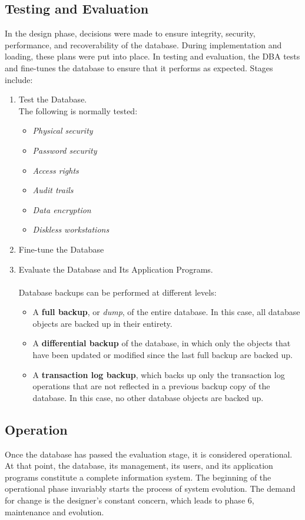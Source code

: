 \documentclass[a4paper, 12pt, titlepage]{report}
\begin{document}
\subsection{Testing and	Evaluation}
In the design phase, decisions were made to ensure integrity, security, performance, and recoverability of the database. During implementation and loading, these plans were put into place. In testing and evaluation, the DBA tests and fine-tunes the database to ensure that it performs as expected. Stages include:
\begin{enumerate}
\item Test the Database. \\ The following is normally tested:
\begin{itemize}
\item \emph{Physical security}
\item \emph{Password security }
\item \emph{Access rights}
\item \emph{Audit trails }
\item \emph{Data encryption}
\item \emph{Diskless workstations}
\end{itemize}
\item Fine-tune the Database
\item Evaluate the Database and Its Application Programs. \\ \\ Database backups can be performed at different levels:
\begin{itemize}
\item A \textbf{full backup}, or \emph{dump}, of the entire database. In this case, all database objects are backed up in their entirety.
\item A \textbf{differential backup} of the database, in which only the objects that have been updated or modified since the last full backup are backed up.
\item A \textbf{transaction log backup}, which backs up only the transaction log operations that are not reflected in a previous backup copy of the database. In this case, no other database objects are backed up. 
\end{itemize}
\end{enumerate}

\subsection{Operation}
Once the database has passed the evaluation stage, it is considered operational. At that point, the database, its management, its users, and its application programs constitute a
complete information system. The beginning of the operational phase invariably starts the process of system evolution. The demand for change is the designer’s constant concern, which leads to phase 6, maintenance and evolution.
\end{document}
